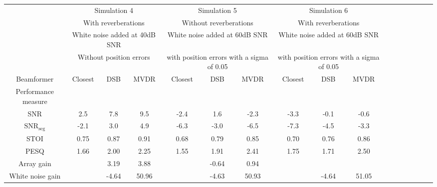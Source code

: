 \begin{sidewaystable}[h]
\begin{adjustbox}{max width=\textwidth}
\begin{tabular}{|c|c|c|c|c|c|c|c|c|c|c|c|c|c|c|c|c|}
 & \multicolumn{3}{c|}{Simulation 4} & \multicolumn{3}{c|}{Simulation 5} & \multicolumn{3}{c|}{Simulation 6} \\
 & \multicolumn{3}{c|}{With reverberations}				& \multicolumn{3}{c|}{Without reverberations} 						& \multicolumn{3}{c|}{With reverberations} 									\\ 
 & \multicolumn{3}{c|}{White noise added at 40dB SNR}	& \multicolumn{3}{c|}{White noise added at 60dB SNR} 				& \multicolumn{3}{c|}{White noise added at 60dB SNR} 						\\
 & \multicolumn{3}{c|}{Without position errors}			& \multicolumn{3}{c|}{with position errors with a sigma of 0.05}	& \multicolumn{3}{c|}{with position errors with a sigma of 0.05} 			\\ \hline
 
Beamformer				& Closest  	& DSB 	& MVDR 	& Closest  	& DSB 	& MVDR 	& Closest  	& DSB 	& MVDR \\ \hline

Performance measure 	& 			& 		&  		&  			&  		&  		&  			&  		& 		\\
						
SNR 					& 2.5		& 7.8	& 9.5 	& -2.4 		& 1.6 	& -2.3 	& -3.3 		& -0.1 	&  -0.6 \\
							
$\text{SNR}_\text{seg}$	& -2.1		& 3.0	& 4.9 	& -6.3 		& -3.0	& -6.5 	& -7.3 		& -4.5 	&  -3.3 \\
							
STOI    				& 0.75		& 0.87	& 0.91	& 0.68 		& 0.79 	& 0.85 	& 0.70 		& 0.76 	& 0.86 \\
							
PESQ  					& 1.66		& 2.00	& 2.25 	& 1.55 		& 1.91 	& 2.41 	& 1.75 		& 1.71 	& 2.50 \\
							
Array gain  			& 			& 3.19	& 3.88 	&  			& -0.64	& 0.94	&  			& 		&  		\\
							
White noise gain 		& 			& -4.64	& 50.96	&  			& -4.63	& 50.93	&  			& -4.64 & 51.05 \\


\hline
\end{tabular}
\end{adjustbox}
\end{sidewaystable}







